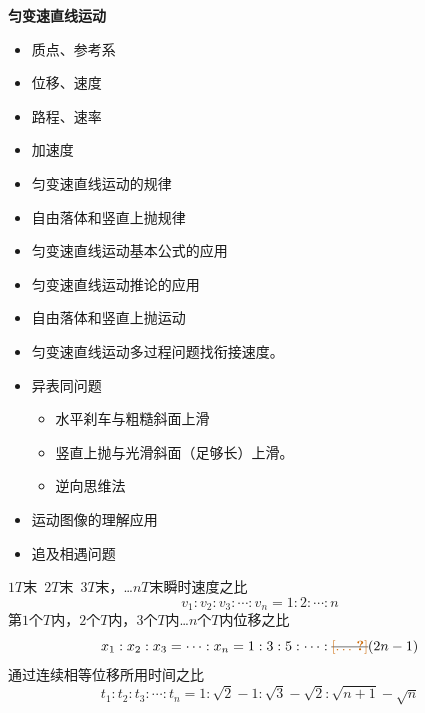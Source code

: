 \textbf{匀变速直线运动}
\begin{itemize}
  \item 质点、参考系
  \item 位移、速度
  \item 路程、速率
  \item 加速度
\end{itemize}
\begin{itemize}
  \item 匀变速直线运动的规律
  \item 自由落体和竖直上抛规律
\end{itemize}
\begin{itemize}
  \item 匀变速直线运动基本公式的应用
  \item 匀变速直线运动推论的应用
  \item 自由落体和竖直上抛运动
  \item 匀变速直线运动多过程问题\quad 找衔接速度。
  \item 异表同问题
  \begin{itemize}
    \item 水平刹车与粗糙斜面上滑
    \item 竖直上抛与光滑斜面（足够长）上滑。
    \item 逆向思维法
  \end{itemize}
  \item 运动图像的理解应用
  \item 追及相遇问题
\end{itemize}
$1T$末\ $2T$末\ $3T$末，…$nT$末瞬时速度之比
\[ v_1:v_2:v_3:\cdots:v_n=1:2:\cdots:n \]
第$1$个$T$内，$2$个$T$内，$3$个$T$内…$n$个$T$内位移之比
\[ x_1:x_2:x_3=\cdots:x_n=1:3:5:\cdots:\text{\struck{\unclear{…}}}(2n-1) \] %
通过连续相等位移所用时间之比
\[ t_1:t_2:t_3:\cdots:t_n=1:\sqrt{2}-1:\sqrt{3}-\sqrt{2}:\sqrt{n+1}-\sqrt{n} \] %
